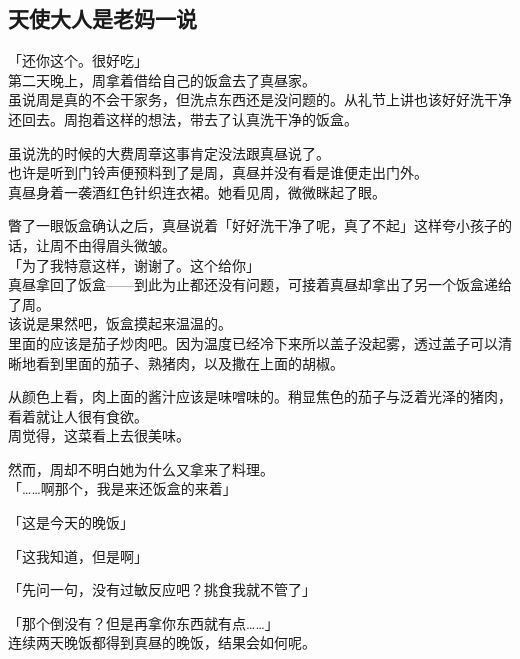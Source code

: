 \subsection{天使大人是老妈一说}

「还你这个。很好吃」\\

第二天晚上，周拿着借给自己的饭盒去了真昼家。\\

虽说周是真的不会干家务，但洗点东西还是没问题的。从礼节上讲也该好好洗干净还回去。周抱着这样的想法，带去了认真洗干净的饭盒。

虽说洗的时候的大费周章这事肯定没法跟真昼说了。\\

也许是听到门铃声便预料到了是周，真昼并没有看是谁便走出门外。\\

真昼身着一袭酒红色针织连衣裙。她看见周，微微眯起了眼。

瞥了一眼饭盒确认之后，真昼说着「好好洗干净了呢，真了不起」这样夸小孩子的话，让周不由得眉头微皱。\\

「为了我特意这样，谢谢了。这个给你」\\

真昼拿回了饭盒——到此为止都还没有问题，可接着真昼却拿出了另一个饭盒递给了周。\\

该说是果然吧，饭盒摸起来温温的。\\

里面的应该是茄子炒肉吧。因为温度已经冷下来所以盖子没起雾，透过盖子可以清晰地看到里面的茄子、熟猪肉，以及撒在上面的胡椒。

从颜色上看，肉上面的酱汁应该是味噌味的。稍显焦色的茄子与泛着光泽的猪肉，看着就让人很有食欲。\\

周觉得，这菜看上去很美味。

然而，周却不明白她为什么又拿来了料理。\\

「……啊那个，我是来还饭盒的来着」

「这是今天的晚饭」

「这我知道，但是啊」

「先问一句，没有过敏反应吧？挑食我就不管了」

「那个倒没有？但是再拿你东西就有点……」\\

连续两天晚饭都得到真昼的晚饭，结果会如何呢。\\

